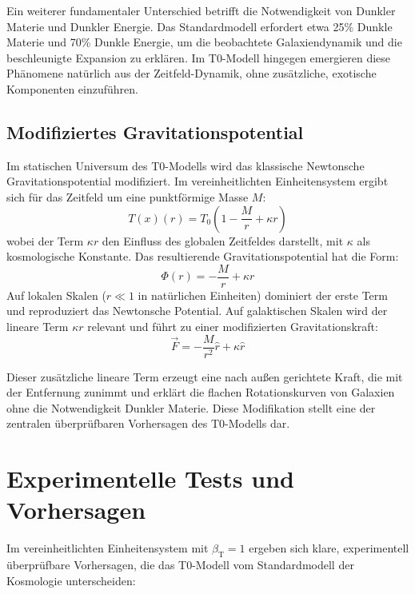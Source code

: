 \documentclass[12pt,a4paper]{article}
\newcommand{\Tfield}{T(x)}
\newcommand{\Tzero}{T_0}
\newcommand{\betaT}{\beta_{\text{T}}}
\begin{document}
	Ein weiterer fundamentaler Unterschied betrifft die Notwendigkeit von Dunkler Materie und Dunkler Energie. Das Standardmodell erfordert etwa 25\% Dunkle Materie und 70\% Dunkle Energie, um die beobachtete Galaxiendynamik und die beschleunigte Expansion zu erklären. Im T0-Modell hingegen emergieren diese Phänomene natürlich aus der Zeitfeld-Dynamik, ohne zusätzliche, exotische Komponenten einzuführen.
	
	
	
	\subsection{Modifiziertes Gravitationspotential}
	Im statischen Universum des T0-Modells wird das klassische Newtonsche Gravitationspotential modifiziert. Im vereinheitlichten Einheitensystem ergibt sich für das Zeitfeld um eine punktförmige Masse \(M\):
	\begin{equation}
		\Tfield(r) = \Tzero\left(1 - \frac{M}{r} + \kappa r\right)
	\end{equation}
	wobei der Term \(\kappa r\) den Einfluss des globalen Zeitfeldes darstellt, mit \(\kappa\) als kosmologische Konstante. Das resultierende Gravitationspotential hat die Form:
	\begin{equation}
		\Phi(r) = -\frac{M}{r} + \kappa r
	\end{equation}
	Auf lokalen Skalen (\(r \ll 1\) in natürlichen Einheiten) dominiert der erste Term und reproduziert das Newtonsche Potential. Auf galaktischen Skalen wird der lineare Term \(\kappa r\) relevant und führt zu einer modifizierten Gravitationskraft:
	\begin{equation}
		\vec{F} = -\frac{M}{r^2} \hat{r} + \kappa \hat{r}
	\end{equation}
	
	

	
	Dieser zusätzliche lineare Term erzeugt eine nach außen gerichtete Kraft, die mit der Entfernung zunimmt und erklärt die flachen Rotationskurven von Galaxien ohne die Notwendigkeit Dunkler Materie. Diese Modifikation stellt eine der zentralen überprüfbaren Vorhersagen des T0-Modells dar.
	
	\section{Experimentelle Tests und Vorhersagen}
	Im vereinheitlichten Einheitensystem mit \(\betaT = 1\) ergeben sich klare, experimentell überprüfbare Vorhersagen, die das T0-Modell vom Standardmodell der Kosmologie unterscheiden:
	
\end{document}
